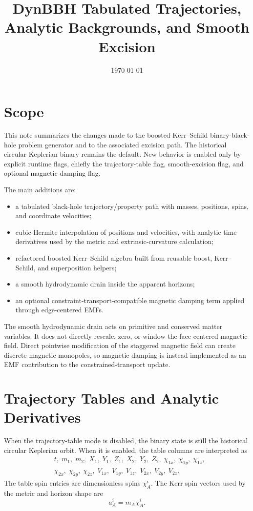 \documentclass[11pt]{article}
\title{DynBBH Tabulated Trajectories, Analytic Backgrounds, and Smooth Excision}
\author{}
\date{\today}
\begin{document}
\maketitle

\section{Scope}

This note summarizes the changes made to the boosted Kerr--Schild
binary-black-hole problem generator and to the associated excision path.
The historical circular Keplerian binary remains the default.  New behavior
is enabled only by explicit runtime flags, chiefly the trajectory-table flag,
smooth-excision flag, and optional magnetic-damping flag.

The main additions are:
\begin{itemize}
  \item a tabulated black-hole trajectory/property path with masses,
  positions, spins, and coordinate velocities;
  \item cubic-Hermite interpolation of positions and velocities, with
  analytic time derivatives used by the metric and extrinsic-curvature
  calculation;
  \item refactored boosted Kerr--Schild algebra built from reusable boost,
  Kerr--Schild, and superposition helpers;
  \item a smooth hydrodynamic drain inside the apparent horizons;
  \item an optional constraint-transport-compatible magnetic damping term
  applied through edge-centered EMFs.
\end{itemize}

The smooth hydrodynamic drain acts on primitive and conserved matter
variables.  It does not directly rescale, zero, or window the face-centered
magnetic field.  Direct pointwise modification of the staggered magnetic
field can create discrete magnetic monopoles, so magnetic damping is instead
implemented as an EMF contribution to the constrained-transport update.

\section{Trajectory Tables and Analytic Derivatives}

When the trajectory-table mode is disabled, the binary state is still the
historical circular Keplerian orbit.  When it is enabled, the table columns
are interpreted as
\begin{equation}
\begin{split}
&t,\; m_1,\; m_2,\; X_1,\;Y_1,\;Z_1,\;X_2,\;Y_2,\;Z_2,\;
\chi_{1x},\;\chi_{1y},\;\chi_{1z},\\
&\chi_{2x},\;\chi_{2y},\;\chi_{2z},\;
V_{1x},\;V_{1y},\;V_{1z},\;V_{2x},\;V_{2y},\;V_{2z}.
\end{split}
\end{equation}
The table spin entries are dimensionless spins \(\chi_A^i\).  The Kerr
spin vectors used by the metric and horizon shape are
\begin{equation}
  a_A^i = m_A\chi_A^i .
\end{equation}
\end{document}
